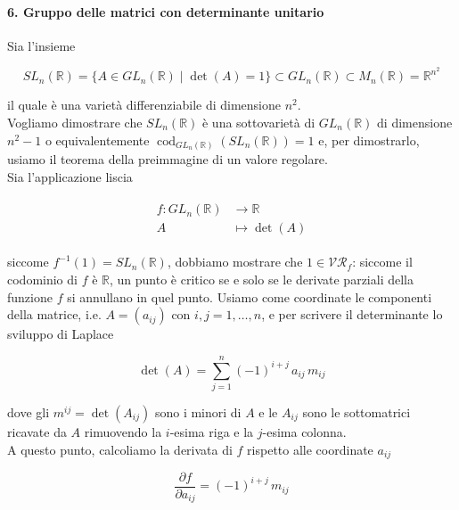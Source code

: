 \paragraph{6. Gruppo delle matrici con determinante unitario}

Sia l'insieme

\begin{equation}
	SL_{n}(\mathbb{R}) = \{ A \in GL_{n}(\mathbb{R}) \mid \det(A) = 1 \} \subset GL_{n}(\mathbb{R}) \subset M_{n}(\mathbb{R}) = \mathbb{R}^{n^{2}}
\end{equation}

il quale è una varietà differenziabile di dimensione $ n^{2} $.\\
Vogliamo dimostrare che $ SL_{n}(\mathbb{R}) $ è una sottovarietà di $ GL_{n}(\mathbb{R}) $ di dimensione $ n^{2}-1 $ o equivalentemente $ \operatorname{cod}_{GL_{n}(\mathbb{R})}(SL_{n}(\mathbb{R})) = 1 $ e, per dimostrarlo, usiamo il teorema della preimmagine di un valore regolare.\\
Sia l'applicazione liscia

\begin{align}
	\begin{split}
		f : GL_{n}(\mathbb{R}) &\to \mathbb{R}\\
		A &\mapsto \det(A)
	\end{split}
\end{align}

siccome $ f^{-1}(1) = SL_{n}(\mathbb{R}) $, dobbiamo mostrare che $ 1 \in \mathcal{VR}_{f} $: siccome il codominio di $ f $ è $ \mathbb{R} $, un punto è critico se e solo se le derivate parziali della funzione $ f $ si annullano in quel punto. Usiamo come coordinate le componenti della matrice, i.e. $ A = (a_{ij}) $ con $ i,j=1,\dots,n $, e per scrivere il determinante lo sviluppo di Laplace

\begin{equation}
	\det(A) = \sum_{j=1}^{n} (-1)^{i+j} \, a_{ij} \, m_{ij}
\end{equation}

dove gli $ m^{ij} = \det(A_{ij}) $ sono i minori di $ A $ e le $ A_{ij} $ sono le sottomatrici ricavate da $ A $ rimuovendo la $ i $-esima riga e la $ j $-esima colonna.\\
A questo punto, calcoliamo la derivata di $ f $ rispetto alle coordinate $ a_{ij} $

\begin{equation}
	\dfrac{\partial f}{\partial a_{ij}} = (-1)^{i+j} \, m_{ij}
\end{equation}

